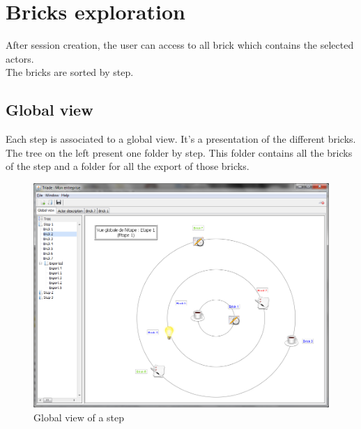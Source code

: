 \chapter{Bricks exploration}


After session creation, the user can access to all brick which contains the selected actors.\\

The bricks are sorted by step.\\

\section{Global view}

Each step is associated to a global view. It's a presentation of the different bricks. The tree on the left present one folder by step. This folder contains all the bricks of the step and a folder for all the export of those bricks.\\


\begin{figure}[h!]
\centering

\includegraphics[scale=0.35]{images/vue_globale.png}
\caption{Global view of a step}

\end{figure}

